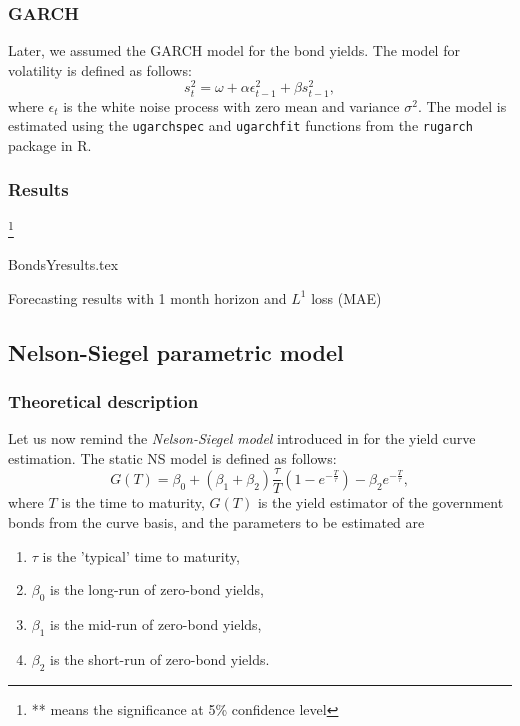         \subsubsection{GARCH}
            Later, we assumed the GARCH model for the bond yields. The model for volatility is defined as follows:
            \begin{equation}\label{eq:GARCH}
                s_t^2 = \omega + \alpha \epsilon_{t-1}^2 + \beta s_{t-1}^2,
            \end{equation}
            where $\epsilon_t$ is the white noise process with zero mean and variance $\sigma^2$.
            The model is estimated using the \texttt{ugarchspec} and \texttt{ugarchfit} functions from the \texttt{rugarch} package in R.
            
        \subsubsection{Results}\footnote{** means the significance at 5\% confidence level}
        \

            \begin{table}[!htbp]
                {BondsYresults.tex}
                \label{tab:naiveres}
                \caption{Forecasting results with 1 month horizon and $L^1$ loss (MAE)}
            \end{table}

    \subsection{Nelson-Siegel parametric model}
        \subsubsection{Theoretical description}
            Let us now remind the \emph{Nelson-Siegel model} introduced in \cite{Nelson1987} for the yield curve estimation. The 
            static NS model is defined as follows:
            \begin{equation}\label{eq:NS}
                G(T) = \beta_0 + (\beta_1+\beta_2)\frac{\tau}{T}\left(1-e^{-\frac{T}{\tau}}\right)-\beta_2  e^{-\frac{T}{\tau}},
            \end{equation}
            where $T$ is the time to maturity, $G(T)$ is the yield estimator of the government bonds from the curve basis, 
            and the parameters to be estimated are
            \begin{enumerate}
                \item $\tau$ is the 'typical' time to maturity, 
                \item $\beta_0$ is the long-run of zero-bond yields, 
                \item $\beta_1$ is the mid-run of zero-bond yields, 
                \item $\beta_2$ is the short-run of zero-bond yields.
            \end{enumerate}

